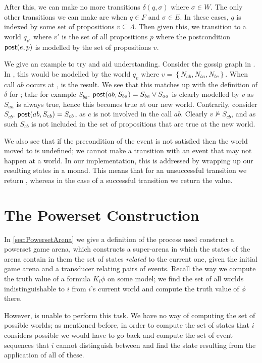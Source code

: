 \documentclass[ %
                    author={Leo Poulson},
                supervisor={Dr. Steven Ramsay},
                    degree={BSc},
                     title={Epistemic Planning for the Dynamic Gossip problem},
                  subtitle={},
                      year={2019} ]{dissertation}
\begin{document}
After this, we can make no more transitions $\delta(q, \sigma)$ where $\sigma
\in W$. The only other transitions we can make are when $q \in F$ and $\sigma
\in E$. In these cases, $q$ is indexed by some set of propositions $v \subseteq
\Lambda$. Then given this, we transition to a world $q_{v'}$ where $v'$ is the
set of all propositions $p$ where the postcondition $\textsf{post}(e, p)$ is modelled by
the set of propositions $v$. 

We give an example to try and aid understanding. Consider the gossip graph in
. In \mestar, this would be modelled by the world $q_v$
where $v = \left\{ N_{ab}, N_{ba}, N_{bc} \right\}$. When call $ab$ occurs at
,  is the result. We see that
this matches up with the definition of $\delta$ for \mestar; take for example
$S_{ba}$. $\textsf{post}(ab, S_{ba}) = S_{ba} \lor S_{aa}$ is clearly modelled by $v$ as
$S_{aa}$ is always true, hence this becomes true at our new world. Contrarily,
consider $S_{cb}$. $\textsf{post}(ab, S_{cb}) = S_{cb}$, as $c$ is not involved in the
call $ab$. Clearly $v \not \models S_{cb}$, and as such $S_{cb}$ is not included
in the set of propositions that are true at the new world.

We also see that if the precondition of the event is not satisfied then the
world moved to is undefined; we cannot make a transition with an event that may
not happen at a world. In our implementation, this is addressed by wrapping up
our resulting states in a  monad. This means that for an unsuccessful
transition we return , whereas in the case of a successful
transition we return  the value. 

\section{The Powerset Construction}
\label{sec:PowersetAdapted}

In \ref{sec:PowersetArena} we give a definition of the process used construct a
powerset game arena, which constructs a super-arena in which the states of the
arena contain in them the set of states \emph{related} to the current one, given
the initial game arena and a transducer relating pairs of events. Recall the way
we compute the truth value of a formula $K_i \phi$ on some model; we find the
set of all worlds indistinguishable to $i$ from $i$'s current world and compute
the truth value of $\phi$ there.

However, \mestar is unable to perform this task. We have no way of computing the
set of possible worlds; as mentioned before, in order to compute the set
of states that $i$ considers possible we would have to go back and compute the
set of event sequences that $i$ cannot distinguish between and find the state
resulting from the application of all of these. 
\end{document}
